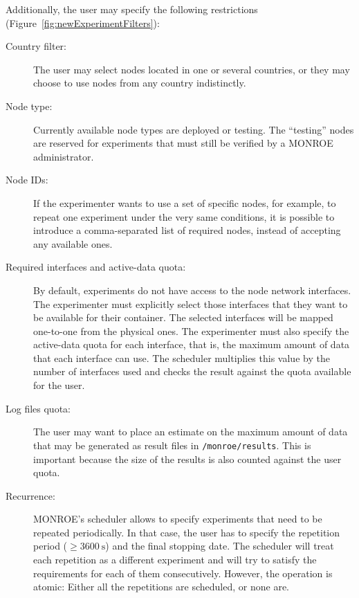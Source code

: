 \documentclass[a4paper,10pt]{article}
\newcommand{\monroe}{MONROE}
\newcommand{\identifier}[1]{{\texttt{\small{#1}}}}
\begin{document}
Additionally, the user may specify the following restrictions (Figure~\ref{fig:newExperimentFilters}):
\begin{description}
	\item [Country filter:] The user may select nodes located in one or several countries, or they may choose to use nodes from any country indistinctly.
	\item [Node type:] %
	Currently available node types are deployed or testing.
	The ``testing'' nodes are reserved for experiments that must still be verified by a \monroe{} administrator.
	\item [Node IDs:] If the experimenter wants to use a set of specific nodes, for example, to repeat one experiment under the very same conditions, it is possible to introduce a comma-separated list of required nodes, instead of accepting any available ones.
	\item [Required interfaces and active-data quota:] By default, experiments do not have access to the node network interfaces.
	The experimenter must explicitly select those interfaces that they want to be available for their container.
	The selected interfaces will be mapped one-to-one from the physical ones.
	The experimenter must also specify the active-data quota for each interface, that is, the maximum amount of data that each interface can use.
	The scheduler multiplies this value by the number of interfaces used and checks the result against the quota available for the user.
	\item [Log files quota:] The user may want to place an estimate on the maximum amount of data that may be generated as result files in \identifier{/monroe/results}.
	This is important because the size of the results is also counted against the user quota.
	
	\item [Recurrence:] \monroe{}'s scheduler allows to specify experiments that need to be repeated periodically.
	In that case, the user has to specify the repetition period ($\ge \SI{3600}{\second}$) and the final stopping date.
	The scheduler will treat each repetition as a different experiment and will try to satisfy the requirements for each of them consecutively.
	However, the operation is atomic:
	Either all the repetitions are scheduled, or none are.
\end{description}
\end{document}
